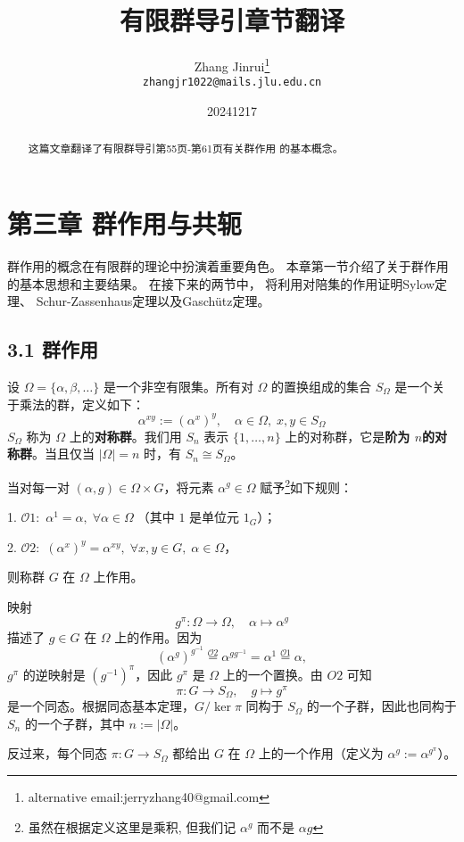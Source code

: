\documentclass[UTF8]{ctexart}
\title{有限群导引章节翻译}
\author{Zhang Jinrui\thanks{alternative email:jerryzhang40@gmail.com} \\ \texttt{zhangjr1022@mails.jlu.edu.cn}}
\date{20241217}  %
\begin{document}
\maketitle

\begin{abstract}
    这篇文章翻译了有限群导引第55页-第61页有关群作用
    的基本概念。\cite[有限群导引]{Kurzweil_Stellmacher_2004b}
\end{abstract}

\section{第三章 群作用与共轭}
群作用的概念在有限群的理论中扮演着重要角色。
本章第一节介绍了关于群作用的基本思想和主要结果。
在接下来的两节中，
将利用对陪集的作用证明Sylow定理、
Schur-Zassenhaus定理以及Gaschütz定理。
\subsection{3.1 群作用}
设 $\Omega = \{\alpha, \beta, \dots\}$ 是一个非空有限集。所有对 $\Omega$ 的置换组成的集合 $S_\Omega$ 是一个关于乘法的群，定义如下：
$$
    \alpha^{xy} := (\alpha^x)^y, \quad \alpha \in \Omega, \; x, y \in S_\Omega
$$
$S_\Omega$ 称为 $\Omega$ 上的\textbf{对称群}。我们用 $S_n$ 表示 $\{1, \dots, n\}$ 上的对称群，它是\textbf{阶为 $n$的对称群}。当且仅当 $|\Omega| = n$ 时，有 $S_n \cong S_\Omega$。

当对每一对 $(\alpha, g) \in \Omega \times G$，将元素 $\alpha^g \in \Omega$ 赋予\footnote[1]{虽然在根据定义这里是乘积, 但我们记 $\alpha^g$ 而不是
    $\alpha g$}如下规则：

1. $\mathcal{O}1:$ $ \alpha^1 = \alpha, \; \forall \alpha \in \Omega \;$（其中 $1$ 是单位元 $1_G$）；

2. $\mathcal{O}2:$ $ (\alpha^x)^y = \alpha^{xy}, \; \forall x, y \in G, \; \alpha \in \Omega$，

则称群 $G$ 在 $\Omega$ 上作用。

映射
$$
    g^\pi : \Omega \to \Omega, \quad \alpha \mapsto \alpha^g
$$
描述了 $g \in G$ 在 $\Omega$ 上的作用。因为
$$
    (\alpha^g)^{g^{-1}} \overset{\mathcal{O}2}{=} \alpha^{gg^{-1}} = \alpha^1 \overset{\mathcal{O}1}{=} \alpha,
$$
$g^\pi$ 的逆映射是 $(g^{-1})^\pi$，因此 $g^\pi$ 是 $\Omega$ 上的一个置换。由 $O2$ 可知
$$
    \pi: G \to S_\Omega, \quad g \mapsto g^\pi
$$
是一个同态。根据同态基本定理，$G / \ker \pi$ 同构于 $S_\Omega$ 的一个子群，因此也同构于 $S_n$ 的一个子群，其中 $n := |\Omega|$。

反过来，每个同态 $\pi: G \to S_\Omega$ 都给出 $G$ 在 $\Omega$ 上的一个作用（定义为 $\alpha^g := \alpha^{g^\pi}$）。
\end{document}

